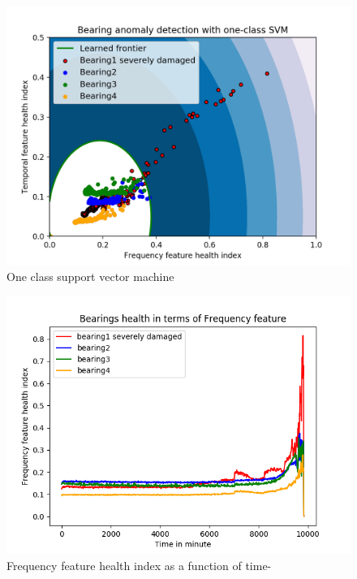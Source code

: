 \documentclass[../Main/thesis.tex]{subfiles}
\begin{document}
\begin{figure}[H] %
   \centering
   \includegraphics[width=5.3in]{../fig/svm.png} 
   \caption{One class support vector machine }
   \label{fig:one-class-svmt}
\end{figure}
\begin{figure}[H] %
   \centering
   \includegraphics[width=5.3in]{../fig/frequency_feature_health.png} 
   \caption{Frequency feature health index as a function of time-}
   \label{fig:frequency_feature_health}
\end{figure}
\end{document}

